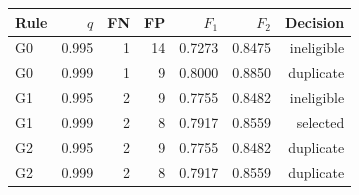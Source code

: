 \begin{tabular}{lrrrrrr}
\toprule
Rule & $q$ & FN & FP & $F_1$ & $F_2$ & Decision \\
\midrule
G0 & 0.995 & 1 & 14 & 0.7273 & 0.8475 & ineligible \\
G0 & 0.999 & 1 & 9 & 0.8000 & 0.8850 & duplicate \\
G1 & 0.995 & 2 & 9 & 0.7755 & 0.8482 & ineligible \\
G1 & 0.999 & 2 & 8 & 0.7917 & 0.8559 & selected \\
G2 & 0.995 & 2 & 9 & 0.7755 & 0.8482 & duplicate \\
G2 & 0.999 & 2 & 8 & 0.7917 & 0.8559 & duplicate \\
\bottomrule
\end{tabular}
